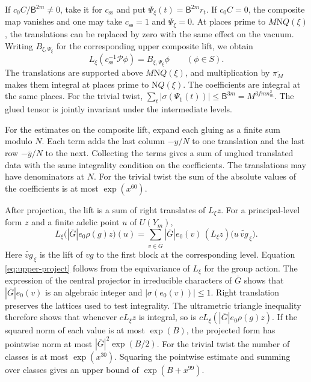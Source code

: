 If \(c_0C/\mathsf B^{2m}\ne0\), take it for \(c_{\mathrm{ss}}\) and
put \(\Psi_\xi(t)=\mathsf B^{2m}r_t\).
If \(c_0C=0\), the composite map vanishes and one may take
\(c_{\mathrm{ss}}=1\) and \(\Psi_\xi=0\).
At places prime to \(M\mathrm NQ(\xi)\), the translations can be
replaced by zero with the same effect on the vacuum.
Writing \(B_{\xi,\Psi_\xi}\) for the corresponding upper composite
lift, we obtain
\begin{equation}\label{eq:upper-seesaw}
 L_\xi(c_{\mathrm{ss}}^{-1}\mathcal P\phi)=B_{\xi,\Psi_\xi}\phi
 \qquad(\phi\in S).
\end{equation}
The translations are supported above \(M\mathrm NQ(\xi)\), and
multiplication by \(\overline{\pi_M}\) makes them integral at places
prime to \(\mathrm NQ(\xi)\).
The coefficients are integral at the same places. For the trivial twist,
\(\sum_t|\sigma(\Psi_1(t))|\le\mathsf B^{3m}=M^{3fmn_m^2}\).
The glued tensor is jointly invariant under the intermediate levels.

For the estimates on the composite lift, expand each gluing as a
finite sum modulo \(N\). Each term adds the last column \(-y/N\) to
one translation and the last row \(-\overline y/N\) to the next.
Collecting the terms gives a sum of unglued translated data with
the same integrality condition on the coefficients.
The translations may have denominators at \(N\). For the trivial
twist the sum of the absolute values of the coefficients is at most
\(\exp(x^{60})\).

After projection, the lift is a sum of right translates of \(L_\xi z\).
For a principal-level form \(z\) and a finite adelic point \(u\) of \(U(Y_m)\),
\begin{equation}\label{eq:upper-project}
 L_\xi\bigl(|\overline G|e_0\rho(g)z\bigr)(u)
 =
 \sum_{v\in\overline G}|\overline G|e_0(v)\,
            (L_\xi z)\bigl(u\,\widetilde{vg}_{\,\xi}\bigr).
\end{equation}
Here \(\widetilde{vg}_{\,\xi}\) is the lift of \(vg\) to the first block at
the corresponding level. Equation \eqref{eq:upper-project} follows from
the equivariance of \(L_\xi\) for the group action.
The expression of the central projector in irreducible characters of
\(\overline G\) shows that \(|\overline G|e_0(v)\) is an algebraic integer
and \(|\sigma(e_0(v))|\le 1\).
Right translation preserves the lattices used to test integrality.
The ultrametric triangle inequality therefore shows that whenever
\(cL_\xi z\) is integral, so is \(cL_\xi(|\overline G|e_0\rho(g)z)\).
If the squared norm of each value is at most \(\exp(B)\), the projected
form has pointwise norm at most \(|\overline G|^2\exp(B/2)\).
For the trivial twist the number of classes is at most \(\exp(x^{30})\).
Squaring the pointwise estimate and summing over classes gives an upper
bound of \(\exp(B+x^{99})\).

